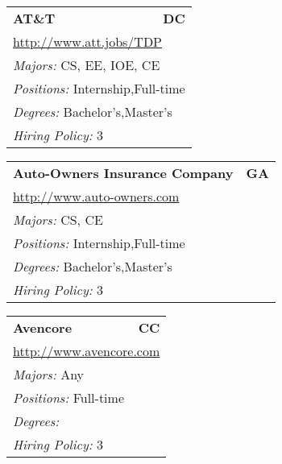 \documentclass[twoside]{article}
\begin{document}
\begin{center}
\begin{multicols}{3}
\begin{FlushLeft}
\begin{minipage}{\columnwidth}
\end{minipage}
 
\begin{minipage}{\columnwidth}\begin{tabularx}{.95\columnwidth}{Xr}
                 {\Large\bf AT\&T} & {\Large\bf DC}\\
    \multicolumn{2}{p{.95\columnwidth}}{\url{http://www.att.jobs/TDP}}\\
    \multicolumn{2}{p{.95\columnwidth}}{\emph{Majors:} CS, EE, IOE, CE}\\
    \multicolumn{2}{p{.95\columnwidth}}{\emph{Positions:} Internship,Full-time}\\
    \multicolumn{2}{p{.95\columnwidth}}{\emph{Degrees:} Bachelor's,Master's}\\
    \multicolumn{2}{p{.95\columnwidth}}{\emph{Hiring Policy:} 3}\\
    \end{tabularx}
    
\end{minipage}
 
\begin{minipage}{\columnwidth}\begin{tabularx}{.95\columnwidth}{Xr}
                 {\Large\bf Auto-Owners Insurance Company} & {\Large\bf GA}\\
    \multicolumn{2}{p{.95\columnwidth}}{\url{http://www.auto-owners.com}}\\
    \multicolumn{2}{p{.95\columnwidth}}{\emph{Majors:} CS, CE}\\
    \multicolumn{2}{p{.95\columnwidth}}{\emph{Positions:} Internship,Full-time}\\
    \multicolumn{2}{p{.95\columnwidth}}{\emph{Degrees:} Bachelor's,Master's}\\
    \multicolumn{2}{p{.95\columnwidth}}{\emph{Hiring Policy:} 3}\\
    \end{tabularx}
    
\end{minipage}
 
\begin{minipage}{\columnwidth}\begin{tabularx}{.95\columnwidth}{Xr}
                 {\Large\bf Avencore} & {\Large\bf CC}\\
    \multicolumn{2}{p{.95\columnwidth}}{\url{http://www.avencore.com}}\\
    \multicolumn{2}{p{.95\columnwidth}}{\emph{Majors:} Any}\\
    \multicolumn{2}{p{.95\columnwidth}}{\emph{Positions:} Full-time}\\
    \multicolumn{2}{p{.95\columnwidth}}{\emph{Degrees:} }\\
    \multicolumn{2}{p{.95\columnwidth}}{\emph{Hiring Policy:} 3}\\
    \end{tabularx}
    

\end{minipage}
\end{FlushLeft}
\end{multicols}
\end{center}
\end{document}
